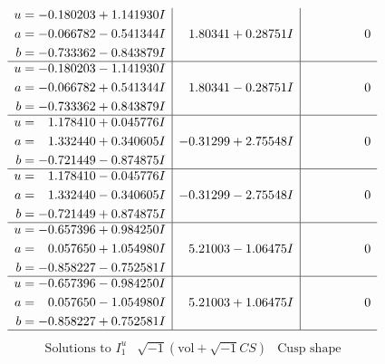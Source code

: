 \documentclass[1p]{elsarticle_modified}
\theoremstyle{definition}
\newcommand{\I}{\sqrt{-1}}
\begin{document}
$$\begin{array}{c|c|c}
\begin{aligned}
u &= -0.180203 + 1.141930 I \\
a &= -0.066782 - 0.541344 I \\
b &= -0.733362 - 0.843879 I\end{aligned}
 & \phantom{-}1.80341 + 0.28751 I & \phantom{-0.000000 } 0 \\ \hline\begin{aligned}
u &= -0.180203 - 1.141930 I \\
a &= -0.066782 + 0.541344 I \\
b &= -0.733362 + 0.843879 I\end{aligned}
 & \phantom{-}1.80341 - 0.28751 I & \phantom{-0.000000 } 0 \\ \hline\begin{aligned}
u &= \phantom{-}1.178410 + 0.045776 I \\
a &= \phantom{-}1.332440 + 0.340605 I \\
b &= -0.721449 - 0.874875 I\end{aligned}
 & -0.31299 + 2.75548 I & \phantom{-0.000000 } 0 \\ \hline\begin{aligned}
u &= \phantom{-}1.178410 - 0.045776 I \\
a &= \phantom{-}1.332440 - 0.340605 I \\
b &= -0.721449 + 0.874875 I\end{aligned}
 & -0.31299 - 2.75548 I & \phantom{-0.000000 } 0 \\ \hline\begin{aligned}
u &= -0.657396 + 0.984250 I \\
a &= \phantom{-}0.057650 + 1.054980 I \\
b &= -0.858227 - 0.752581 I\end{aligned}
 & \phantom{-}5.21003 - 1.06475 I & \phantom{-0.000000 } 0 \\ \hline\begin{aligned}
u &= -0.657396 - 0.984250 I \\
a &= \phantom{-}0.057650 - 1.054980 I \\
b &= -0.858227 + 0.752581 I\end{aligned}
 & \phantom{-}5.21003 + 1.06475 I & \phantom{-0.000000 } 0\\
 \hline 
 \end{array}$$\newpage$$\begin{array}{c|c|c}  
\text{Solutions to }I^u_{1}& \I (\text{vol} + \sqrt{-1}CS) & \text{Cusp shape}\\
 \hline 
\begin{aligned}

\end{aligned}
\end{array}$$
\end{document}
